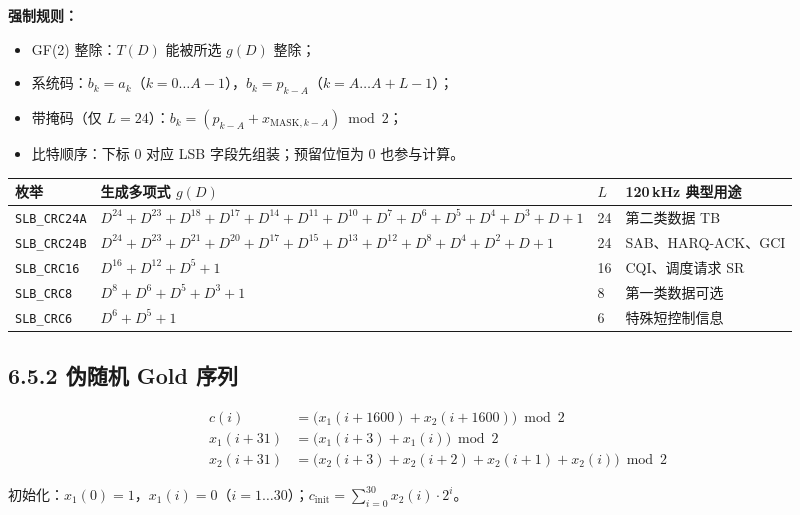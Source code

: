 \documentclass[11pt,a4paper]{ctexart}
\begin{document}
\textbf{强制规则：}
\begin{itemize}[nosep]
  \item GF(2) 整除：$T(D)$ 能被所选 $g(D)$ 整除；
  \item 系统码：$b_k=a_k$（$k{=}0\ldots A{-}1$），$b_k=p_{k-A}$（$k{=}A\ldots A{+}L{-}1$）；
  \item 带掩码（仅 $L{=}24$）：$b_k=(p_{k-A}+x_{\mathrm{MASK},k-A})\bmod 2$；
  \item 比特顺序：下标 0 对应 LSB 字段先组装；预留位恒为 0 也参与计算。
\end{itemize}

\begin{table}[h]
\centering
\small
\begin{tabular}{llll}
\toprule
\textbf{枚举} & \textbf{生成多项式 $g(D)$} & \textbf{$L$} & \textbf{120\,kHz 典型用途} \\
\midrule
\texttt{SLB\_CRC24A} & $D^{24}{+}D^{23}{+}D^{18}{+}D^{17}{+}D^{14}{+}D^{11}{+}D^{10}{+}D^{7}{+}D^{6}{+}D^{5}{+}D^{4}{+}D^{3}{+}D{+}1$ & 24 & 第二类数据 TB \\
\texttt{SLB\_CRC24B} & $D^{24}{+}D^{23}{+}D^{21}{+}D^{20}{+}D^{17}{+}D^{15}{+}D^{13}{+}D^{12}{+}D^{8}{+}D^{4}{+}D^{2}{+}D{+}1$ & 24 & SAB、HARQ-ACK、GCI \\
\texttt{SLB\_CRC16} & $D^{16}{+}D^{12}{+}D^{5}{+}1$ & 16 & CQI、调度请求 SR \\
\texttt{SLB\_CRC8} & $D^{8}{+}D^{6}{+}D^{5}{+}D^{3}{+}1$ & 8 & 第一类数据可选 \\
\texttt{SLB\_CRC6} & $D^{6}{+}D^{5}{+}1$ & 6 & 特殊短控制信息 \\
\bottomrule
\end{tabular}
\end{table}

\subsection{6.5.2 伪随机 Gold 序列}

\begin{align}
c(i) &= \bigl(x_1(i{+}1600) + x_2(i{+}1600)\bigr) \bmod 2 \\
x_1(i{+}31) &= \bigl(x_1(i{+}3) + x_1(i)\bigr) \bmod 2 \\
x_2(i{+}31) &= \bigl(x_2(i{+}3) + x_2(i{+}2) + x_2(i{+}1) + x_2(i)\bigr) \bmod 2
\end{align}

初始化：$x_1(0){=}1$，$x_1(i){=}0$（$i{=}1\ldots 30$）；$c_{\mathrm{init}}=\sum_{i=0}^{30} x_2(i)\cdot 2^i$。
\end{document}
